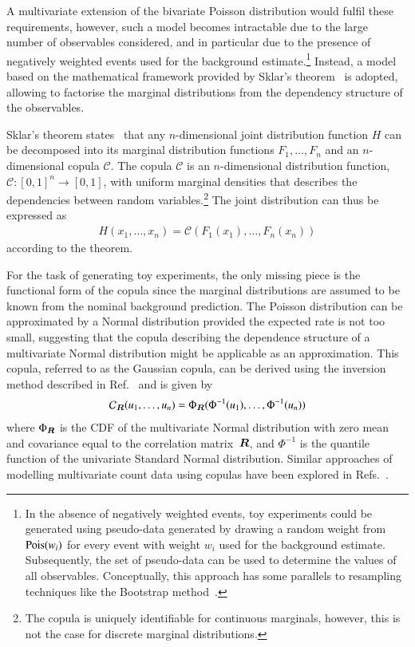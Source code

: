 A multivariate extension of the bivariate Poisson distribution would fulfil
these requirements, however, such a model becomes intractable due to the large
number of observables considered, and in particular due to the presence of
negatively weighted events used for the background estimate.\footnote{In the
  absence of negatively weighted events, toy experiments could be generated
  using pseudo-data generated by drawing a random weight from $\operatorname{Pois}(w_i)$ for
  every event with weight $w_i$ used for the background estimate. Subsequently,
  the set of pseudo-data can be used to determine the values of all
  observables. Conceptually, this approach has some parallels to resampling
  techniques like the Bootstrap
  method~\cite{10.1214/aos/1176344552,efron1994introduction}.} Instead, a model
based on the mathematical framework provided by Sklar's
theorem~\cite{Sklar1959FonctionsDR} is adopted, allowing to factorise the
marginal distributions from the dependency structure of the observables.

Sklar's theorem states~\cite{nelsen} that any $n$-dimensional joint distribution
function $H$ can be decomposed into its marginal distribution functions
$F_1, \dots, F_n$ and an $n$-dimensional copula $\mathcal{C}$. The copula
$\mathcal{C}$ is an $n$-dimensional distribution function,
$\mathcal{C}: [0, 1]^n \rightarrow [0, 1]$, with uniform marginal densities that
describes the dependencies between random variables.\footnote{The copula is
  uniquely identifiable for continuous marginals, however, this is not the case
  for discrete marginal distributions.} The joint distribution can thus be
expressed as
\begin{align*}
  H(x_1, \dots, x_n) = \mathcal{C}(F_1(x_1), \dots, F_n(x_n))
\end{align*}
according to the theorem.

For the task of generating toy experiments, the only missing piece is the
functional form of the copula since the marginal distributions are assumed to be
known from the nominal background prediction. The Poisson distribution can be
approximated by a Normal distribution provided the expected rate is not too
small, suggesting that the copula describing the dependence structure of a
multivariate Normal distribution might be applicable as an approximation. This
copula, referred to as the Gaussian copula, can be derived using the inversion
method described in Ref.~\cite{nelsen} and is given by
\begin{align}
  \label{eq:gaussian_copula}
  \mathcal{C}_{\bm{R}}(u_1, \dots, u_n) = \Phi_{\bm{R}}(\Phi^{-1}(u_1), \dots, \Phi^{-1}(u_n))
\end{align}
where $\Phi_{\bm{R}}$ is the CDF of the multivariate Normal distribution with
zero mean and covariance equal to the correlation matrix~$\bm{R}$, and
$\Phi^{-1}$ is the quantile function of the univariate Standard Normal
distribution. Similar approaches of modelling multivariate count data using
copulas have been explored in Refs.~\cite{10.1002/wics.1398}.

